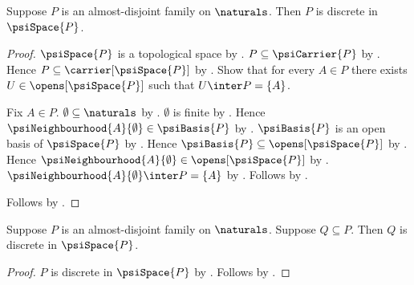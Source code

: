 \begin{theorem}\label{psi_family_discrete}
    Suppose $P$ is an almost-disjoint family on $\naturals$.
    Then $P$ is discrete in $\psiSpace{P}$.
\end{theorem}
\begin{proof}
    $\psiSpace{P}$ is a topological space
        by .
    $P\subseteq\psiCarrier{P}$ by .
    Hence $P\subseteq\carrier[\psiSpace{P}]$ by .
    Show that for every $A\in P$ there exists
        $U\in\opens[\psiSpace{P}]$ such that $U\inter P=\{A\}$.
    \begin{subproof}
        Fix $A\in P$.
        $\emptyset\subseteq\naturals$ by .
        $\emptyset$ is finite by .
        Hence $\psiNeighbourhood{A}{\emptyset}\in\psiBasis{P}$
            by .
        $\psiBasis{P}$ is an open basis of $\psiSpace{P}$
            by .
        Hence $\psiBasis{P}\subseteq\opens[\psiSpace{P}]$
            by .
        Hence $\psiNeighbourhood{A}{\emptyset}\in
            \opens[\psiSpace{P}]$ by .
        $\psiNeighbourhood{A}{\emptyset}\inter P=\{A\}$
            by .
        Follows by \auto.
    \end{subproof}
    Follows by .
\end{proof}

\begin{corollary}\label{psi_family_subset_discrete}
    Suppose $P$ is an almost-disjoint family on $\naturals$.
    Suppose $Q\subseteq P$.
    Then $Q$ is discrete in $\psiSpace{P}$.
\end{corollary}
\begin{proof}
    $P$ is discrete in $\psiSpace{P}$ by .
    Follows by .
\end{proof}

